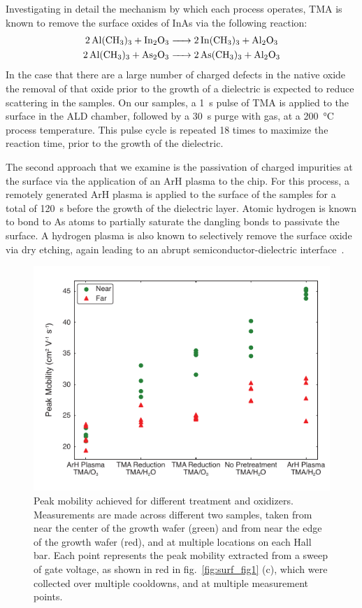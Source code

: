 Investigating in detail the mechanism by which each process operates, TMA is known to remove the surface oxides of InAs via the following reaction\cite{iiiv_cleanup}:
\begin{align}
    \ce{2Al(CH3)3 + In2O3 &-> 2In(CH3)3 + Al2O3} \\
    \ce{2Al(CH3)3 + As2O3 &-> 2As(CH3)3 + Al2O3}
\end{align}
In the case that there are a large number of charged defects in the native oxide the removal of that oxide prior to the growth of a  dielectric is expected to reduce scattering in the samples. On our samples, a \SI{1}{\second} pulse of TMA is applied to the surface in the ALD chamber, followed by a \SI{30}{\second} purge with  gas, at a \SI{200}{\celsius} process temperature. This pulse cycle is repeated 18 times to maximize the reaction time, prior to the growth of the dielectric.

The second approach that we examine is the passivation of charged impurities at the surface via the application of an ArH plasma to the chip\cite{CLEVELAND2013167,BELL1998125,doi:10.1116/1.586538}. For this process, a remotely generated ArH plasma is applied to the surface of the samples for a total of \SI{120}{\second} before the growth of the dielectric layer. Atomic hydrogen is known to bond to As atoms to partially saturate the dangling bonds to passivate the surface. A hydrogen plasma is also known to selectively remove the surface oxide via dry etching, again leading to an abrupt semiconductor-dielectric interface~\cite{doi:10.1063/1.92194,doi:10.1063/1.100961}.

\begin{figure}
\includegraphics[width=0.6\linewidth]{Figure3}
\caption[Peak mobilities for each treatment]{\label{fig:surf_fig3} Peak mobility achieved for different treatment and oxidizers. Measurements are made across different two samples, taken from near the center of the growth wafer (green) and from near the edge of the growth wafer (red), and at multiple locations on each Hall bar. Each point represents the peak mobility extracted from a sweep of gate voltage, as shown in red in fig.~\ref{fig:surf_fig1} (c), which were collected over multiple cooldowns, and at multiple measurement points.}
\end{figure}

